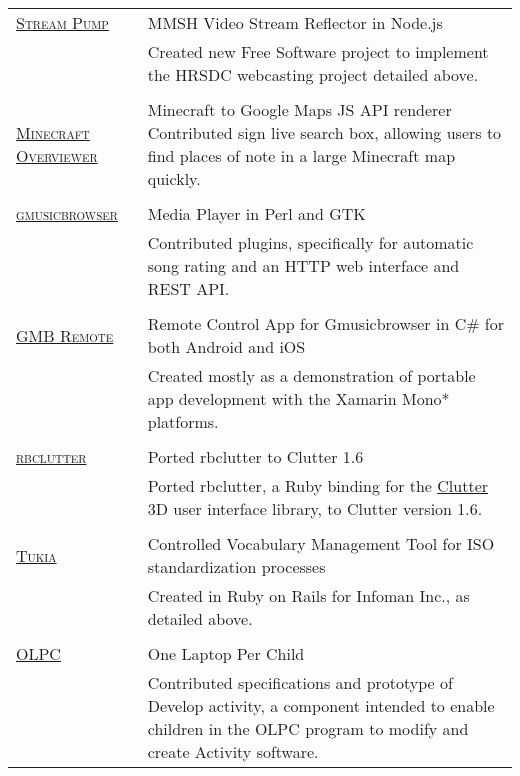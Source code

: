 \documentclass[letterpaper,10pt]{article}
\begin{document}
\begin{longtable}{p{3cm}|p{12cm}}
  \textsc{\href{https://github.com/orospakr/stream-pump}{Stream Pump}} & MMSH Video Stream Reflector in Node.js \\
   & \footnotesize{Created new Free Software project to implement the HRSDC webcasting project detailed above.} \\
  \multicolumn{2}{c}{} \\
  \textsc{\href{https://github.com/brownan/Minecraft-Overviewer}{Minecraft Overviewer}} & Minecraft to Google Maps JS API renderer \newline \footnotesize{Contributed sign live search box, allowing users to find places of note in a large Minecraft map quickly.} \\
  \multicolumn{2}{c}{} \\
  \textsc{\href{http://www.gmusicbrowser.org}{gmusicbrowser}} & Media Player in Perl and GTK \\
   & \footnotesize{Contributed plugins, specifically for automatic song rating and an HTTP web interface and REST API.} \\
  \multicolumn{2}{c}{} \\
  \textsc{\href{https://github.com/orospakr/gmusicbrowser-remote}{GMB Remote}} & Remote Control App for Gmusicbrowser in C\# for both Android and iOS \\
   & \footnotesize{Created mostly as a demonstration of portable app development with the Xamarin Mono* platforms.} \\
  \multicolumn{2}{c}{} \\
  \textsc{\href{https://github.com/orospakr/rbclutter}{rbclutter}} & Ported rbclutter to Clutter 1.6 \\
   & \footnotesize{Ported rbclutter, a Ruby binding for the \href{https://live.gnome.org/Clutter}{Clutter} 3D user interface library, to Clutter version 1.6.} \\
  \multicolumn{2}{c}{} \\
  \textsc{\href{https://github.com/orospakr/tukia}{Tukia}} & Controlled Vocabulary Management Tool for ISO standardization processes \\
   & \footnotesize{Created in Ruby on Rails for Infoman Inc., as detailed above.} \\
  \multicolumn{2}{c}{} \\
  \textsc{\href{http://www.laptop.org}{OLPC}} & One Laptop Per Child \\
   & \footnotesize{Contributed specifications and prototype of Develop activity, a component intended to enable children in the OLPC program to modify and create Activity software.} \\

\end{longtable}
\end{document}
